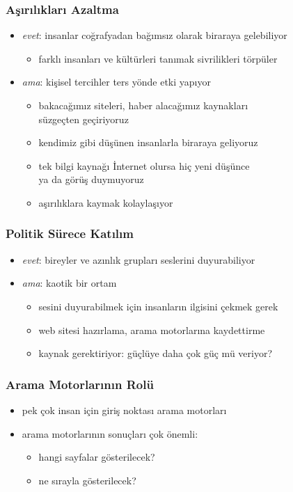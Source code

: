 \documentclass[dvipsnames]{beamer}
\theoremstyle{definition}
\theoremstyle{example}
\theoremstyle{plain}
\begin{document}
\begin{frame}
  \frametitle{Aşırılıkları Azaltma}

  \begin{itemize}
    \item \emph{evet}: insanlar coğrafyadan bağımsız olarak biraraya
      gelebiliyor
    \begin{itemize}
      \item farklı insanları ve kültürleri tanımak sivrilikleri törpüler
    \end{itemize}

    \pause
    \medskip
    \item \emph{ama}: kişisel tercihler ters yönde etki yapıyor
    \begin{itemize}
      \item bakacağımız siteleri, haber alacağımız kaynakları\\
        süzgeçten geçiriyoruz
      \item kendimiz gibi düşünen insanlarla biraraya geliyoruz
      \item tek bilgi kaynağı İnternet olursa hiç yeni düşünce\\
        ya da görüş duymuyoruz
      \item aşırılıklara kaymak kolaylaşıyor
    \end{itemize}
  \end{itemize}
\end{frame}

\begin{frame}
  \frametitle{Politik Sürece Katılım}

  \begin{itemize}
    \item \emph{evet}: bireyler ve azınlık grupları seslerini duyurabiliyor

    \pause
    \medskip
    \item \emph{ama}: kaotik bir ortam
    \begin{itemize}
      \item sesini duyurabilmek için insanların ilgisini çekmek gerek
      \item web sitesi hazırlama, arama motorlarına kaydettirme
      \item kaynak gerektiriyor: güçlüye daha çok güç mü veriyor?
    \end{itemize}
  \end{itemize}
\end{frame}

\begin{frame}
  \frametitle{Arama Motorlarının Rolü}

  \begin{itemize}
    \item pek çok insan için giriş noktası arama motorları
    \item arama motorlarının sonuçları çok önemli:
    \begin{itemize}
      \item hangi sayfalar gösterilecek?
      \item ne sırayla gösterilecek?
    \end{itemize}
  \end{itemize}
\end{frame}
\end{document}
